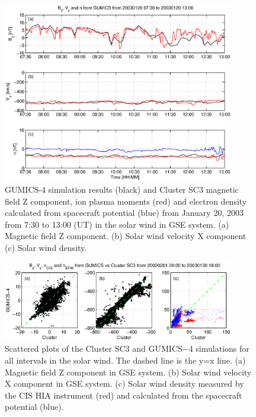 \documentclass[linenumbers,draft]{agujournal}
\begin{document}
\begin{figure}[h]
\centering
\includegraphics[width=0.9\textwidth,angle=0]{swe-2020-corr-f03.eps}  
\caption{GUMICS-4 simulation results (black) and Cluster SC3 magnetic field Z component, ion plasma moments (red) and electron density calculated from spacecraft potential (blue) from January 20, 2003 from 7:30 to 13:00 (UT) in the solar wind in GSE system. (a) Magnetic field Z component. (b) Solar wind velocity X component (c) Solar wind density.}
\label{fig:swplot}
\end{figure}

\pagebreak

\begin{figure}[h]
\centering
\includegraphics[width=0.9\textwidth,angle=0]{swe-2020-corr-f04.eps}
\caption{Scattered plots of the Cluster SC3 and GUMICS$-$4 simulations for all intervals in the solar wind. The dashed line is the y=x line. (a) Magnetic field Z component in GSE system. (b) Solar wind velocity X component in GSE system. (c) Solar wind density measured by the CIS HIA instrument (red) and calculated from the spacecraft potential (blue).}
\label{fig:swscatplot}
\end{figure}

\pagebreak
\end{document}
